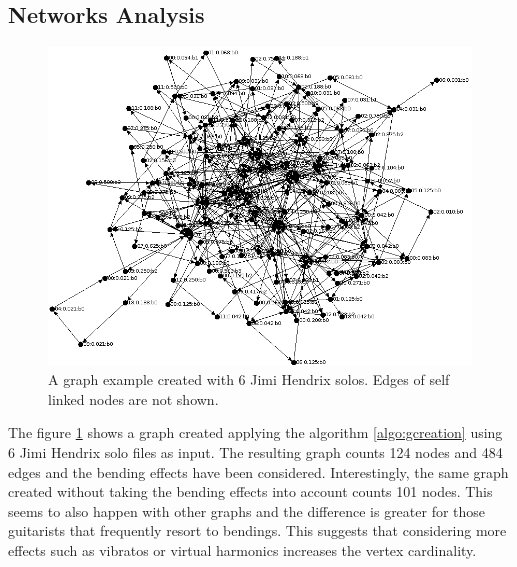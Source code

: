 \documentclass{llncs}
\begin{document}
\subsection{Networks Analysis}
\begin{figure}[H]
\centering
\includegraphics[scale=0.43]{hendrix_graph.png}
\caption{A graph example created with 6 Jimi Hendrix
solos. Edges of self linked nodes are not shown.}
\label{fig:hendrixgraph}
\end{figure}
The figure \ref{fig:hendrixgraph} shows a graph created applying the
algorithm \ref{algo:gcreation} using 6 Jimi Hendrix solo files as input.
The resulting graph counts 124 nodes and 484 edges and the bending
effects have been considered. Interestingly, the same graph created
without taking the bending effects into account counts 101 nodes. This seems to
also happen with other graphs and the difference is greater for those
guitarists that frequently resort to bendings. This suggests that 
considering more effects such as vibratos or virtual harmonics increases
the vertex cardinality.
\end{document}
